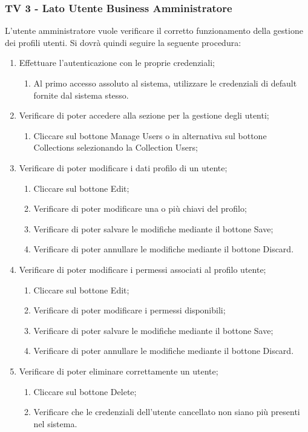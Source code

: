\subsubsection{TV 3 - Lato Utente Business Amministratore}

L'utente amministratore vuole verificare il corretto funzionamento della gestione dei profili utenti.
Si dovrà quindi seguire la seguente procedura:

\begin{enumerate}
\item Effettuare l'autenticazione con le proprie credenziali;
\begin{enumerate}
\item Al primo accesso assoluto al sistema, utilizzare le credenziali di default fornite dal sistema stesso.
\end{enumerate}
\item Verificare di poter accedere alla sezione per la gestione degli utenti;
\begin{enumerate}
\item Cliccare sul bottone Manage Users o in alternativa sul bottone Collections selezionando la Collection Users;
\end{enumerate}
\item Verificare di poter modificare i dati profilo di un utente;
\begin{enumerate}
\item Cliccare sul bottone Edit;
\item Verificare di poter modificare una o più chiavi del profilo;
\item Verificare di poter salvare le modifiche mediante il bottone Save;
\item Verificare di poter annullare le modifiche mediante il bottone Discard.
\end{enumerate}
\item Verificare di poter modificare i permessi associati al profilo utente;
\begin{enumerate}
\item Cliccare sul bottone Edit;
\item Verificare di poter modificare i permessi disponibili;
\item Verificare di poter salvare le modifiche mediante il bottone Save;
\item Verificare di poter annullare le modifiche mediante il bottone Discard.
\end{enumerate}
\item Verificare di poter eliminare correttamente un utente;
\begin{enumerate}
\item Cliccare sul bottone Delete;
\item Verificare che le credenziali dell'utente cancellato non siano più presenti nel sistema.
\end{enumerate}
\end{enumerate}


